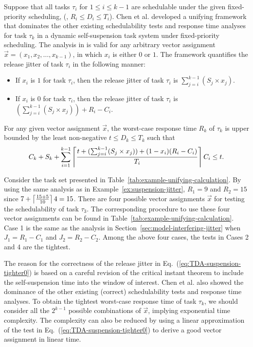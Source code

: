   Suppose that all tasks $\tau_i$ for $1 \leq i \leq k-1$ are
  schedulable under the given fixed-priority scheduling, (\ie, $R_i
  \leq D_i \leq T_i$). Chen et al. \cite{ChenECRTS2016-suspension}
  developed a unifying framework that dominates the other existing
  schedulability tests and response time analyses for task $\tau_k$ in
  a dynamic self-suspension task system under fixed-priority
  scheduling. The analysis in \cite{ChenECRTS2016-suspension} is valid
  for any arbitrary vector assignment $\vec{x} = (x_1, x_2, \ldots,
  x_{k-1})$, in which $x_i$ is either $0$ or $1$. The framework
  quantifies the release jitter of task $\tau_i$ in the following
  manner:
  \begin{itemize}
  \item If $x_i$ is $1$ for task $\tau_i$, then the release jitter of
    task $\tau_i$ is $\sum_{j=i}^{k-1} (S_j \times x_j)$. 
  \item If $x_i$ is $0$ for task $\tau_i$, then the release jitter of
    task $\tau_i$ is $(\sum_{j=i}^{k-1} (S_j \times x_j)) + R_i-C_i$. 
  \end{itemize}
  For any given vector assignment $\vec{x}$, the worst-case response
  time $R_k$ of $\tau_k$ is upper bounded by the least non-negative $t
  \leq D_k \leq T_k$ such that
  {\small \begin{equation} \label{eq:TDA-suspension-tighter0} C_k +
      S_k + \sum_{i=1}^{k-1}\left\lceil{\frac{t+ (\sum_{j=i}^{k-1} (S_j
          \times x_j))+(1-x_i)(R_i-C_i)}{T_i}}\right\rceil C_i \leq t.
     \end{equation}}

\begin{example} 
\label{ex:rationale_unifying}  
Consider the task set presented in
Table~\ref{tab:example-unifying-calculation}.  By using the same
analysis as in Example~\ref{ex:suspension-jitter}, $R_1=9$ and
$R_2=15$ since $7+\left\lceil{\frac{15+5}{10}}\right\rceil4 = 15$.  There are four
possible vector assignments $\vec{x}$ for testing the schedulability
of task $\tau_3$. The corresponding procedure to use these four vector
assignments can be found in
Table~\ref{tab:example-unifying-calculation}.  Case 1 is the same as
the analysis in Section~\ref{sec:model-interfering-jitter} when $J_1 =
R_1-C_1$ and $J_2 = R_2-C_2$.  Among the above four cases, the tests
in Cases 2 and 4 are the tightest.
\hfill\myendproof
\end{example}

The reason for the correctness of the release jitter in
Eq.~(\ref{eq:TDA-suspension-tighter0}) is based on a careful revision
of the critical instant theorem to include the self-suspension time
into the window of interest. Chen et
al. \cite{ChenECRTS2016-suspension} also showed the dominance of the
other existing (correct) schedulability tests and response time
analyses. To obtain the tightest worst-case response time of task
$\tau_k$, we should consider all the $2^{k-1}$ possible combinations
of $\vec{x}$, implying exponential time complexity. The complexity can
also be reduced by using a linear approximation of the test in
Eq.~(\ref{eq:TDA-suspension-tighter0}) to derive a good vector
assignment in linear time.


